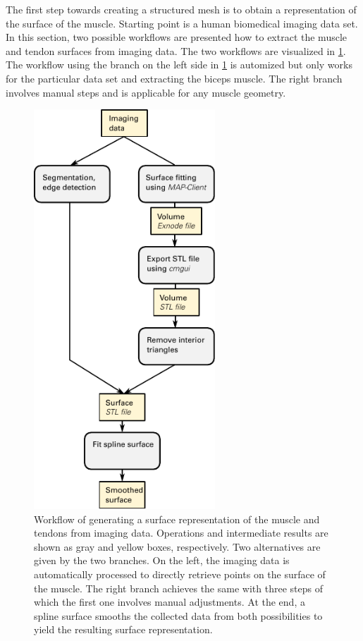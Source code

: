 The first step towards creating a structured mesh is to obtain a representation of the surface of the muscle. 
Starting point is a human biomedical imaging data set. In this section, two possible workflows are presented how to extract the muscle and tendon surfaces from imaging data. 
The two workflows are visualized in \cref{fig:scheme_preprocessing}. The workflow using the branch on the left side in \cref{fig:scheme_preprocessing} is automized but only works for the particular data set and extracting the biceps muscle.
The right branch involves manual steps and is applicable for any muscle geometry.


\begin{figure}%
  \centering%
  \includegraphics[height=15cm]{images/fiber_creation/scheme_preprocessing.pdf}%
  \caption{Workflow of generating a surface representation of the muscle and tendons from imaging data. Operations and intermediate results are shown as gray and yellow boxes, respectively. Two alternatives are given by the two branches. On the left, the imaging data is automatically processed to directly retrieve points on the surface of the muscle. The right branch achieves the same with three steps of which the first one involves manual adjustments. At the end, a spline surface smooths the collected data from both possibilities to yield the resulting surface representation.}%
  \label{fig:scheme_preprocessing}%
\end{figure}%

